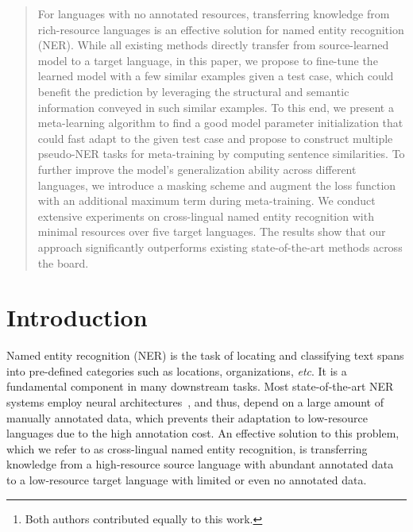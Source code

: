 \documentclass[letterpaper]{article} \usepackage{aaai20}  \usepackage{times}  \usepackage{helvet} \usepackage{courier}  \usepackage[hyphens]{url}  \usepackage{graphicx} \urlstyle{rm} \def\UrlFont{\rm}  \usepackage{graphicx}
\author{Qianhui Wu\textsuperscript{\rm 1}, Zijia Lin\textsuperscript{\rm 2}\thanks{Both authors contributed equally to this work.}, Guoxin Wang\textsuperscript{\rm 2}, Hui Chen\textsuperscript{\rm 3}, Börje F. Karlsson\textsuperscript{\rm 2}\\ \Large \textbf{Biqing Huang\textsuperscript{\rm 1}, Chin-Yew Lin\textsuperscript{\rm 2}} \\ 
	\textsuperscript{\rm 1}Beijing National Research Center for Information Science and Technology (BNRist)\\Department of Automation, Tsinghua University, Beijing
	100084, China\\
	\textsuperscript{\rm 2}Microsoft Research, Beijing, China\\
	\textsuperscript{\rm 3}Beijing National Research Center for Information Science and Technology (BNRist)\\School of Software, Tsinghua University, Beijing
	100084, China\\
	wuqianhui@tsinghua.org.cn, \{zijlin, guow, borje.karlsson, cyl\}@microsoft.com\\
	jichenhui2012@gmail.com, hbq@tsinghua.edu.cn
}
\newcommand{\etc}{\textit{etc}}
\begin{document}
\maketitle

\begin{abstract}

For languages with no annotated resources, transferring knowledge from rich-resource languages is an effective solution for named entity recognition (NER). 
While all existing methods directly transfer from source-learned model to a target language, in this paper, we propose to fine-tune the learned model with a few similar examples given a test case, which could benefit the prediction by leveraging the structural and semantic information conveyed in such similar examples.
To this end, we present a meta-learning algorithm to find a good model parameter initialization that could fast adapt to the given test case and propose to construct multiple pseudo-NER tasks for meta-training by computing sentence similarities. 
To further improve the model's generalization ability across different languages, we introduce a masking scheme and augment the loss function with an additional maximum term during meta-training. 
We conduct extensive experiments on cross-lingual named entity recognition with minimal resources over five target languages. The results show that our approach significantly outperforms existing state-of-the-art methods across the board.

\end{abstract} \section{Introduction}
Named entity recognition (NER) is the task of locating and classifying text spans into pre-defined categories such as locations, organizations, \etc. 
It is a fundamental component in many downstream tasks. 
Most state-of-the-art NER systems employ neural architectures~\cite{huang2015bidirectional,lample2016neural,ma2016CNNBLSTMCRF,chiu2016named,peters2017semi,peters2018deep}, and thus, depend on a large amount of manually annotated data, which prevents their adaptation to low-resource languages due to the high annotation cost. 
An effective solution to this problem, which we refer to as cross-lingual named entity recognition, is transferring knowledge from a high-resource source language with abundant annotated data to a low-resource target language with limited or even no annotated data.
\end{document}
